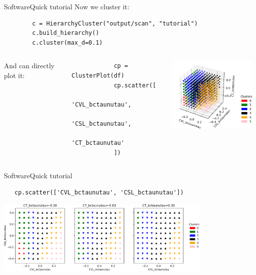 \begin{frame}[fragile]{Software}{Quick tutorial}
    Now we cluster it: 
    
    \begin{verbatim}
        c = HierarchyCluster("output/scan", "tutorial")
        c.build_hierarchy()
        c.cluster(max_d=0.1)
    \end{verbatim}
    
    \begin{columns}
        And can directly plot it:
        
        \begin{changemargin}{0.32cm}{0cm}
        \begin{verbatim}
            cp = ClusterPlot(df)
            cp.scatter([
                'CVL_bctaunutau',
                'CSL_bctaunutau',
                'CT_bctaunutau'
            ])
        \end{verbatim}
        \end{changemargin}
        \centering
        \includegraphics[width=5.5cm]{figures/plots/3d.pdf}
    \end{columns}
\end{frame}


\begin{frame}[fragile, t]{Software}{Quick tutorial}
\vspace{0.75cm}
\begin{verbatim}
   cp.scatter(['CVL_bctaunutau', 'CSL_bctaunutau'])
\end{verbatim}
\vspace{0.2cm}
\centering
\includegraphics[width=10.5cm]{figures/plots/2dpoints.pdf}
\end{frame}

